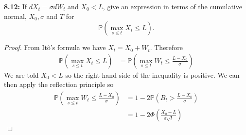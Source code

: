 \documentclass{article}
\begin{document}
\begin{tcolorbox}[colframe=black,colback=gray!5,boxrule=0.5pt]
\textbf{8.12:} If $dX_t = \sigma dW_t$ and $X_0 < L$, give an expression in terms of the cumulative normal, $X_0, \sigma$ and $T$ for 
$$\mathbb{P}\left(\max_{s\leq t} X_t\leq L\right).$$
\end{tcolorbox}
\begin{proof} From Itô's formula we have $X_t = X_0 + W_t$. Therefore 
\begin{align*}
    \mathbb{P}\left(\max_{s\leq t} X_t\leq L\right) &= \mathbb{P}\left(\max_{s\leq t} W_t\leq \frac{L-X_0}{\sigma}\right)
\end{align*}
    We are told $X_0 < L$ so the right hand side of the inequality is positive. We can then apply the reflection principle so 
\begin{align*}
    \mathbb{P}\left(\max_{s\leq t} W_t\leq \frac{L-X_0}{\sigma}\right) &= 1-2\mathbb{P}\left(B_t>\frac{L-X_0}{\sigma}\right) \\
    &=1 - 2\Phi\left(\frac{X_0-L}{\sigma\sqrt{t}}\right)
\end{align*}
\end{proof}


\newpage
 
\end{document}
